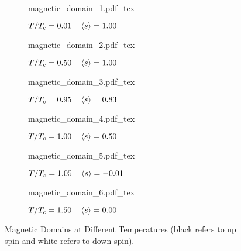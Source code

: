 \documentclass[a4paper, 11pt]{article}
\begin{document}
\begin{figure}[t]
	\begin{subfigure}{0.485\textwidth}
		\centering
		\def\svgwidth{\columnwidth}
		{magnetic_domain_1.pdf_tex}
		\caption{$T/T_c = 0.01 \hspace{1em} \braket{s} = 1.00$}
		\vspace{1em}
	\end{subfigure}
	\hfill
	\begin{subfigure}{0.485\textwidth}
		\centering
		\def\svgwidth{\columnwidth}
		{magnetic_domain_2.pdf_tex}
		\caption{$T/T_c = 0.50 \hspace{1em} \braket{s} = 1.00$}
		\vspace{1em}
	\end{subfigure}
	\vfill
	\begin{subfigure}{0.485\textwidth}
		\centering
		\def\svgwidth{\columnwidth}
		{magnetic_domain_3.pdf_tex}
		\caption{$T/T_c = 0.95 \hspace{1em} \braket{s} = 0.83$}
		\vspace{1em}
	\end{subfigure}
	\hfill
	\begin{subfigure}{0.485\textwidth}
		\centering
		\def\svgwidth{\columnwidth}
		{magnetic_domain_4.pdf_tex}
		\caption{$T/T_c = 1.00 \hspace{1em} \braket{s} = 0.50$}
		\vspace{1em}
	\end{subfigure}
	\vfill
	\begin{subfigure}{0.485\textwidth}
		\centering
		\def\svgwidth{\columnwidth}
		{magnetic_domain_5.pdf_tex}
		\caption{$T/T_c = 1.05 \hspace{1em} \braket{s} = -0.01$}
		\vspace{1em}
	\end{subfigure}
	\hfill
	\begin{subfigure}{0.485\textwidth}
		\centering
		\def\svgwidth{\columnwidth}
		{magnetic_domain_6.pdf_tex}
		\caption{$T/T_c = 1.50 \hspace{1em} \braket{s} = 0.00$}
		\vspace{1em}
	\end{subfigure}
	\caption{\centering Magnetic Domains at Different Temperatures (black refers to up spin and
	         white refers to down spin).}
\end{figure}
\end{document}
